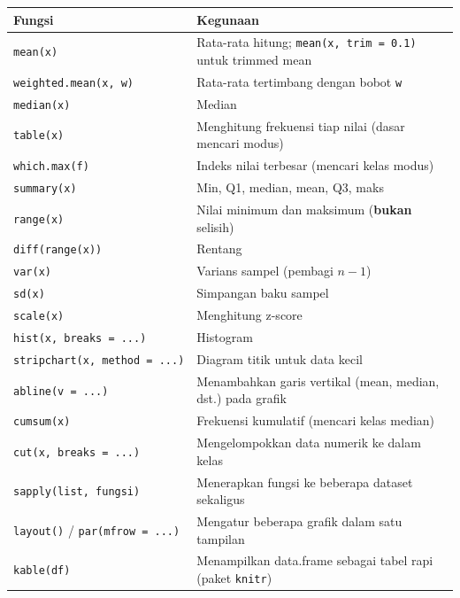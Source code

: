 \documentclass[
  indonesian,
  letterpaper,
]{book}
\newcounter{none} %
\begin{document}
{\def\LTcaptype{none} %
\begin{longtable}[]{@{}
  >{\raggedright\arraybackslash}p{}
  >{\raggedright\arraybackslash}p{}@{}}
\toprule\noalign{}
\begin{minipage}[b]{\linewidth}\raggedright
Fungsi
\end{minipage} & \begin{minipage}[b]{\linewidth}\raggedright
Kegunaan
\end{minipage} \\
\midrule\noalign{}
\endhead
\bottomrule\noalign{}
\endlastfoot
\texttt{mean(x)} & Rata-rata hitung; \texttt{mean(x,\ trim\ =\ 0.1)}
untuk trimmed mean \\
\texttt{weighted.mean(x,\ w)} & Rata-rata tertimbang dengan bobot
\texttt{w} \\
\texttt{median(x)} & Median \\
\texttt{table(x)} & Menghitung frekuensi tiap nilai (dasar mencari
modus) \\
\texttt{which.max(f)} & Indeks nilai terbesar (mencari kelas modus) \\
\texttt{summary(x)} & Min, Q1, median, mean, Q3, maks \\
\texttt{range(x)} & Nilai minimum dan maksimum (\textbf{bukan}
selisih) \\
\texttt{diff(range(x))} & Rentang \\
\texttt{var(x)} & Varians sampel (pembagi \(n-1\)) \\
\texttt{sd(x)} & Simpangan baku sampel \\
\texttt{scale(x)} & Menghitung z-score \\
\texttt{hist(x,\ breaks\ =\ ...)} & Histogram \\
\texttt{stripchart(x,\ method\ =\ ...)} & Diagram titik untuk data
kecil \\
\texttt{abline(v\ =\ ...)} & Menambahkan garis vertikal (mean, median,
dst.) pada grafik \\
\texttt{cumsum(x)} & Frekuensi kumulatif (mencari kelas median) \\
\texttt{cut(x,\ breaks\ =\ ...)} & Mengelompokkan data numerik ke dalam
kelas \\
\texttt{sapply(list,\ fungsi)} & Menerapkan fungsi ke beberapa dataset
sekaligus \\
\texttt{layout()} / \texttt{par(mfrow\ =\ ...)} & Mengatur beberapa
grafik dalam satu tampilan \\
\texttt{kable(df)} & Menampilkan data.frame sebagai tabel rapi (paket
\texttt{knitr}) \\
\end{longtable}
}
\end{document}
